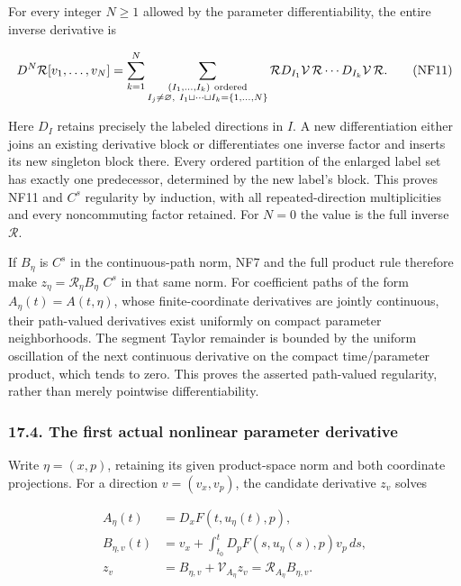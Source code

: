 \documentclass[
  11pt,
]{article}
\begin{document}
For every integer \(N\geq1\) allowed by the parameter differentiability,
the entire inverse derivative is

\[
 D^N\mathcal R[v_1,\ldots,v_N]
 =\sum_{k=1}^N
   \sum_{\substack{(I_1,\ldots,I_k)\ {\rm ordered}\\
                   I_j\ne\varnothing,\ 
                   I_1\sqcup\cdots\sqcup I_k=\{1,\ldots,N\}}}
 \mathcal R D_{I_1}\mathcal V\,\mathcal R\cdots
                       D_{I_k}\mathcal V\,\mathcal R .
 \tag{NF11}
\]

Here \(D_I\) retains precisely the labeled directions in \(I\). A new
differentiation either joins an existing derivative block or
differentiates one inverse factor and inserts its new singleton block
there. Every ordered partition of the enlarged label set has exactly one
predecessor, determined by the new label's block. This proves NF11 and
\(C^s\) regularity by induction, with all repeated-direction
multiplicities and every noncommuting factor retained. For \(N=0\) the
value is the full inverse \(\mathcal R\).

If \(B_\eta\) is \(C^s\) in the continuous-path norm, NF7 and the full
product rule therefore make \(z_\eta=\mathcal R_\eta B_\eta\) \(C^s\) in
that same norm. For coefficient paths of the form
\(A_\eta(t)=A(t,\eta)\), whose finite-coordinate derivatives are jointly
continuous, their path-valued derivatives exist uniformly on compact
parameter neighborhoods. The segment Taylor remainder is bounded by the
uniform oscillation of the next continuous derivative on the compact
time/parameter product, which tends to zero. This proves the asserted
path-valued regularity, rather than merely pointwise differentiability.

\subsubsection{17.4. The first actual nonlinear parameter
derivative}\label{the-first-actual-nonlinear-parameter-derivative}

Write \(\eta=(x,p)\), retaining its given product-space norm and both
coordinate projections. For a direction \(v=(v_x,v_p)\), the candidate
derivative \(z_v\) solves

\[
 \begin{aligned}
 A_\eta(t)&=D_xF(t,u_\eta(t),p),\\
 B_{\eta,v}(t)&=v_x+
           \int_{t_0}^tD_pF(s,u_\eta(s),p)v_p\,ds,\\
 z_v&=B_{\eta,v}+\mathcal V_{A_\eta}z_v
       =\mathcal R_{A_\eta}B_{\eta,v}.
 \end{aligned}
 \tag{NF12}
\]
\end{document}
